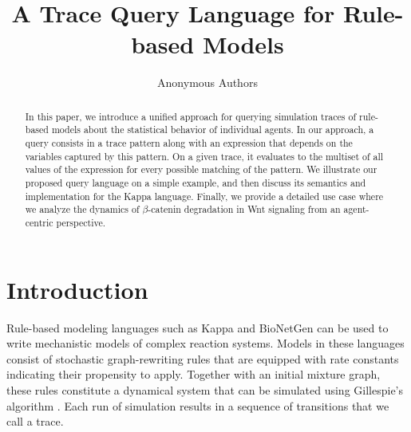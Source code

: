 \documentclass[runningheads]{llncs}
\begin{document}
\title{A Trace Query Language for Rule-based Models}

\author{Anonymous Authors}




\maketitle


\begin{abstract}
  In this paper, we introduce a unified approach for querying
  simulation traces of rule-based models about the statistical
  behavior of individual agents. In our approach, a query consists in
  a trace pattern along with an expression that depends on the
  variables captured by this pattern. On a given trace, it evaluates
  to the multiset of all values of the expression for every possible
  matching of the pattern. We illustrate our proposed query language
  on a simple example, and then discuss its semantics and
  implementation for the Kappa language. Finally, we provide a
  detailed use case where we analyze the dynamics of $\beta$-catenin
  degradation in Wnt signaling from an agent-centric perspective.

\end{abstract}


\section{Introduction}

Rule-based modeling languages such as Kappa \cite{DanosEtAl-CONCUR07}
and BioNetGen \cite{bngl} can be used to write mechanistic models of
complex reaction systems. Models in these languages consist of
stochastic graph-rewriting rules that are equipped with rate constants
indicating their propensity to apply. Together with an initial mixture
graph, these rules constitute a dynamical system that can be simulated
using Gillespie's algorithm
\cite{gillespie1977exact,DanosEtAl-APLAS07,BoutillierEK17}. Each run
of simulation results in a sequence of transitions that we call a
trace.
\end{document}
